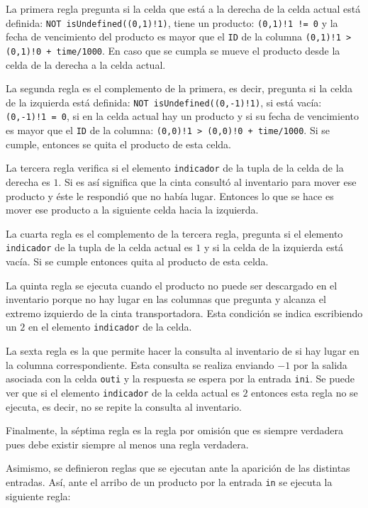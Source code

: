 \documentclass[10pt]{article}
\begin{document}
La primera regla pregunta si la celda que está a la derecha de la celda actual está definida: \texttt{NOT isUndefined((0,1)!1)}, tiene un producto: \texttt{(0,1)!1 != 0} y la fecha de vencimiento del producto es mayor que el \texttt{ID} de la columna \texttt{(0,1)!1 > (0,1)!0 + time/1000}. En caso que se cumpla se mueve el producto desde la celda de la derecha a la celda actual.

La segunda regla es el complemento de la primera, es decir, pregunta si la celda de la izquierda está definida: \texttt{NOT isUndefined((0,-1)!1)}, si está vacía: \texttt{(0,-1)!1 = 0}, si en la celda actual hay un producto y si su fecha de vencimiento es mayor que el \texttt{ID} de la columna: \texttt{(0,0)!1 > (0,0)!0 + time/1000}. Si se cumple, entonces se quita el producto de esta celda.

La tercera regla verifica si el elemento \texttt{indicador} de la tupla de la celda de la derecha es $1$. Si es así significa que la cinta consultó al inventario para mover ese producto y éste le respondió que no había lugar. Entonces lo que se hace es mover ese producto a la siguiente celda hacia la izquierda.

La cuarta regla es el complemento de la tercera regla, pregunta si el elemento \texttt{indicador} de la tupla de la celda actual es $1$ y si la celda de la izquierda está vacía. Si se cumple entonces quita al producto de esta celda.

La quinta regla se ejecuta cuando el producto no puede ser descargado en el inventario porque no hay lugar en las columnas que pregunta y alcanza el extremo izquierdo de la cinta transportadora. Esta condición se indica escribiendo un $2$ en el elemento \texttt{indicador} de la celda.

La sexta regla es la que permite hacer la consulta al inventario de si hay lugar en la columna correspondiente. Esta consulta se realiza enviando $-1$ por la salida asociada con la celda \texttt{outi} y la respuesta se espera por la entrada \texttt{ini}. Se puede ver que si el elemento \texttt{indicador} de la celda actual es $2$ entonces esta regla no se ejecuta, es decir, no se repite la consulta al inventario.

Finalmente, la séptima regla es la regla por omisión que es siempre verdadera pues debe existir siempre al menos una regla verdadera.

Asimismo, se definieron reglas que se ejecutan ante la aparición de las distintas entradas. Así, ante el arribo de un producto por la entrada \texttt{in} se ejecuta la siguiente regla:
\end{document}
